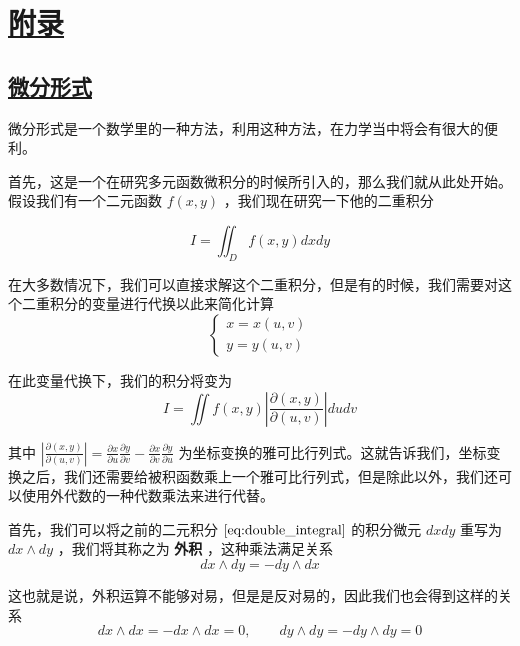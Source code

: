 \chapter{\protect\hyperlink{:}{附录}}


\section{\protect\hyperlink{:}{微分形式}}

微分形式是一个数学里的一种方法，利用这种方法，在力学当中将会有很大的便利。

首先，这是一个在研究多元函数微积分的时候所引入的，那么我们就从此处开始。假设我们有一个二元函数 $f(x,y)$ ，我们现在研究一下他的二重积分

\begin{equation}\label{eq:double_integral}
    I = \iint_D f(x,y) dx dy
\end{equation}

在大多数情况下，我们可以直接求解这个二重积分，但是有的时候，我们需要对这个二重积分的变量进行代换以此来简化计算
\begin{equation}
    \begin{cases}
        x = x(u,v) \\
        y = y(u,v)
    \end{cases}
\end{equation}

在此变量代换下，我们的积分将变为
\begin{equation}
    I = \iint f(x,y) \left| \frac{\partial(x,y)}{\partial(u,v)} \right| du dv
\end{equation}

其中 $\displaystyle \left| \frac{\partial(x,y)}{\partial(u,v)} \right| = \frac{\partial x}{\partial u}\frac{\partial y}{\partial v} - \frac{\partial x}{\partial v}\frac{\partial y}{\partial u}$ 为坐标变换的雅可比行列式。这就告诉我们，坐标变换之后，我们还需要给被积函数乘上一个雅可比行列式，但是除此以外，我们还可以使用外代数的一种代数乘法来进行代替。

首先，我们可以将之前的二元积分 $\ref{eq:double_integral}$ 的积分微元 $dxdy$ 重写为 $dx \wedge dy$ ，我们将其称之为 \textbf{外积} ，这种乘法满足关系
\begin{equation}
    dx \wedge dy = -dy \wedge dx
\end{equation}

这也就是说，外积运算不能够对易，但是是反对易的，因此我们也会得到这样的关系
\begin{equation}
    dx \wedge dx = - dx \wedge dx = 0,\qquad dy \wedge dy = - dy \wedge dy = 0
\end{equation}

